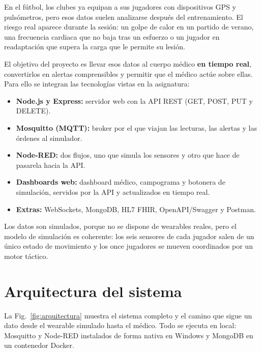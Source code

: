 \documentclass[runningheads]{llncs}
\begin{document}
En el fútbol, los clubes ya equipan a sus jugadores con dispositivos GPS y pulsómetros, pero esos datos suelen analizarse después del entrenamiento. El riesgo real aparece durante la sesión: un golpe de calor en un partido de verano, una frecuencia cardiaca que no baja tras un esfuerzo o un jugador en readaptación que supera la carga que le permite su lesión.

El objetivo del proyecto es llevar esos datos al cuerpo médico \textbf{en tiempo real}, convertirlos en alertas comprensibles y permitir que el médico actúe sobre ellas. Para ello se integran las tecnologías vistas en la asignatura:

\begin{itemize}
  \item \textbf{Node.js y Express:} servidor web con la API REST (GET, POST, PUT y DELETE).
  \item \textbf{Mosquitto (MQTT):} broker por el que viajan las lecturas, las alertas y las órdenes al simulador.
  \item \textbf{Node-RED:} dos flujos, uno que simula los sensores y otro que hace de pasarela hacia la API.
  \item \textbf{Dashboards web:} dashboard médico, campograma y botonera de simulación, servidos por la API y actualizados en tiempo real.
  \item \textbf{Extras:} WebSockets, MongoDB, HL7 FHIR, OpenAPI/Swagger y Postman.
\end{itemize}

Los datos son simulados, porque no se dispone de wearables reales, pero el modelo de simulación es coherente: los seis sensores de cada jugador salen de un único estado de movimiento y los once jugadores se mueven coordinados por un motor táctico.

\section{Arquitectura del sistema}

La Fig.~\ref{fig:arquitectura} muestra el sistema completo y el camino que sigue un dato desde el wearable simulado hasta el médico. Todo se ejecuta en local: Mosquitto y Node-RED instalados de forma nativa en Windows y MongoDB en un contenedor Docker.
\end{document}
